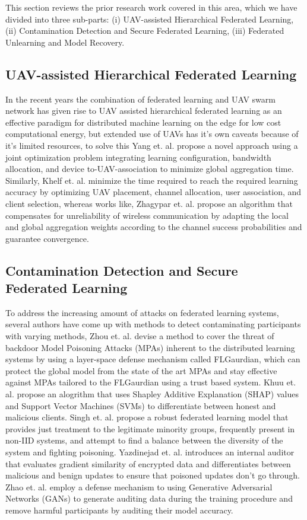 \documentclass[10pt,journal,compsoc]{IEEEtran}
\begin{document}
This section reviews the prior research work covered in this area, which we have divided into three sub-parts: (i) UAV-assisted Hierarchical Federated Learning, (ii) Contamination Detection and Secure Federated Learning, (iii) Federated Unlearning and Model Recovery.

\subsection{UAV-assisted Hierarchical Federated Learning}
In the recent years the combination of federated learning and UAV swarm network has given rise to UAV assisted hierarchical federated learning as an effective paradigm for distributed machine learning on the edge for low cost computational energy, but extended use of UAVs has it's own caveats because of it's limited resources,
to solve this Yang et. al. \cite{UAHFL:adaptive} propose a novel approach using a joint optimization problem integrating learning configuration, bandwidth allocation, and device to-UAV-association to minimize global aggregation time.
Similarly, Khelf et. al. \cite{UAHFL:optimization} minimize the time required to reach the required learning accuracy by optimizing UAV placement, channel allocation, user association, and client selection, whereas works like, Zhagypar et. al. \cite{UAHFL:performance} propose an algorithm that compensates for unreliability of wireless communication by adapting the local and global aggregation weights according to the channel success probabilities and guarantee convergence. 

\subsection{Contamination Detection and Secure Federated Learning}
To address the increasing amount of attacks on federated learning systems, several authors have come up with methods to detect contaminating participants with varying methods, 
Zhou et. al. \cite{ConD:FLGuardian} devise a method to cover the threat of backdoor Model Poisoning Attacks (MPAs) inherent to the distributed learning systems by using a layer-space defense mechanism called FLGaurdian, which can protect the global model from the state of the art MPAs and stay effective against MPAs tailored to the FLGaurdian using a trust based system.
Khuu et. al. \cite{ConD:PoisonDet} propose an alogrithm that uses Shapley Additive Explanation (SHAP) values and Support Vector Machines (SVMs) to differentiate between honest and malicious clients.
Singh et. al. \cite{ConD:FairDet} propose a robust federated learning model that provides just treatment to the legitimate minority groups, frequently present in non-IID systems, and attempt to find a balance between the diversity of the system and fighting poisoning.
Yazdinejad et. al. \cite{ConD:RobustFL} introduces an internal auditor that evaluates gradient similarity of encrypted data and differentiates between malicious and benign updates to ensure that poisoned updates don't go through.
Zhao et. al. \cite{ConD:DetectingFL} employ a defense mechanism to using Generative Adversarial Networks (GANs) to generate auditing data during the training procedure and remove harmful participants by auditing their model accuracy.
\end{document}
